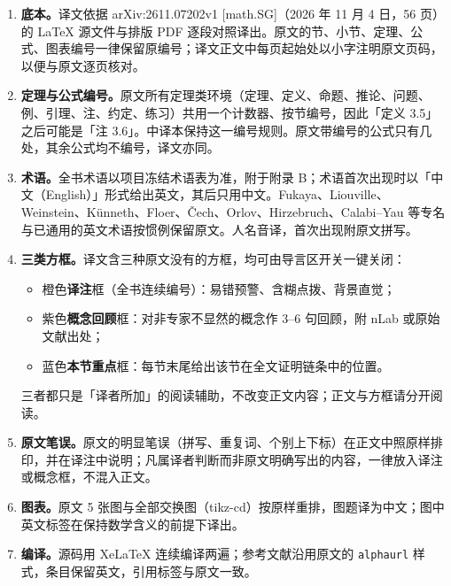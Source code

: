 \documentclass[11pt,a4paper]{article}
\theoremstyle{cnth}
\begin{document}
\begin{enumerate}[label=（\arabic*）,leftmargin=2.4em,itemsep=0.35em]
  \item \textbf{底本。}译文依据 arXiv:2611.07202v1 [math.SG]（2026 年 11 月 4 日，56 页）的 LaTeX 源文件与排版 PDF 逐段对照译出。原文的节、小节、定理、公式、图表编号一律保留原编号；译文正文中每页起始处以小字注明原文页码，以便与原文逐页核对。
  \item \textbf{定理与公式编号。}原文所有定理类环境（定理、定义、命题、推论、问题、例、引理、注、约定、练习）共用一个计数器、按节编号，因此「定义 3.5」之后可能是「注 3.6」。中译本保持这一编号规则。原文带编号的公式只有几处，其余公式均不编号，译文亦同。
  \item \textbf{术语。}全书术语以项目冻结术语表为准，附于附录 B；术语首次出现时以「中文（English）」形式给出英文，其后只用中文。Fukaya、Liouville、Weinstein、Künneth、Floer、Čech、Orlov、Hirzebruch、Calabi--Yau 等专名与已通用的英文术语按惯例保留原文。人名音译，首次出现附原文拼写。
  \item \textbf{三类方框。}译文含三种原文没有的方框，均可由导言区开关一键关闭：
    \begin{itemize}[leftmargin=1.2em,itemsep=0.1em]
      \item 橙色\textbf{译注}框（全书连续编号）：易错预警、含糊点拨、背景直觉；
      \item 紫色\textbf{概念回顾}框：对非专家不显然的概念作 3--6 句回顾，附 nLab 或原始文献出处；
      \item 蓝色\textbf{本节重点}框：每节末尾给出该节在全文证明链条中的位置。
    \end{itemize}
    三者都只是「译者所加」的阅读辅助，不改变正文内容；正文与方框请分开阅读。
  \item \textbf{原文笔误。}原文的明显笔误（拼写、重复词、个别上下标）在正文中照原样排印，并在译注中说明；凡属译者判断而非原文明确写出的内容，一律放入译注或概念框，不混入正文。
  \item \textbf{图表。}原文 5 张图与全部交换图（tikz-cd）按原样重排，图题译为中文；图中英文标签在保持数学含义的前提下译出。
  \item \textbf{编译。}源码用 XeLaTeX 连续编译两遍；参考文献沿用原文的 \texttt{alphaurl} 样式，条目保留英文，引用标签与原文一致。
\end{enumerate}

\vspace{0.5em}

\clearpage
\tableofcontents
\clearpage
\end{document}
